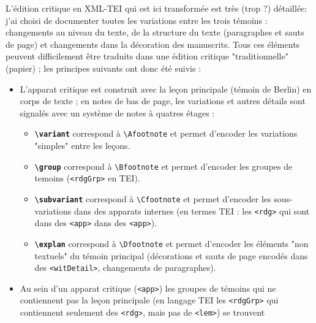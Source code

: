 \documentclass[12pt, a4paper]{article}
\begin{document}
            L'édition critique en XML-TEI qui est ici transformée est très (trop ?) 
            détaillée: j'ai choisi de documenter toutes les variations entre les trois 
            témoins : changements au niveau du texte, de la structure du texte 
            (paragraphes et sauts de page) et changements dans la décoration des 
            manuscrits. Tous ces éléments peuvent difficilement être traduits 
            dans une édition critique "traditionnelle" (papier) ; les principes 
            suivants ont donc été suivis :
            \begin{itemize}
            	\item{L'apparat critique est construit avec la leçon principale (témoin de 
            		Berlin) en corps de texte ; en notes de bas de page, les variations et 
            		autres détails sont signalés avec un système de notes à quatres étages :}
            		\begin{itemize}
            			\item{\textbf{\texttt{\textbackslash variant}} correspond à \texttt{\textbackslash Afootnote} et 
            				permet d'encoder les variations "simples" entre les leçons.}
            			\item{\textbf{\texttt{\textbackslash group}} correspond à \texttt{\textbackslash Bfootnote} et 
            				permet d'encoder les groupes de temoins (\texttt{<rdgGrp>} 
            				en TEI).}
            			\item{\textbf{\texttt{\textbackslash subvariant}} correspond à \texttt{\textbackslash Cfootnote} 
            			et permet d'encoder les sous-variations dans des apparats internes 
            			(en termes TEI : les \texttt{<rdg>} qui sont dans des 
            			\texttt{<app>} dans des \texttt{<app>}).}
            			\item{\textbf{\texttt{\textbackslash explan}} correspond à \texttt{\textbackslash Dfootnote} et 
            				permet d'encoder les éléments "non textuels" du témoin principal 
            				(décorations et sauts de page encodés dans des \texttt{<witDetail>},
            				changements de paragraphes).}
            		\end{itemize}
            	\item{Au sein d'un apparat critique (\texttt{<app>}) les groupes de 
            		témoins qui ne contiennent pas la leçon principale (en langage TEI 
            		les \texttt{<rdgGrp>} qui contiennent seulement des 
            		\texttt{<rdg>}, mais pas de \texttt{<lem>}) se trouvent 
}
\end{itemize}
\end{document}
